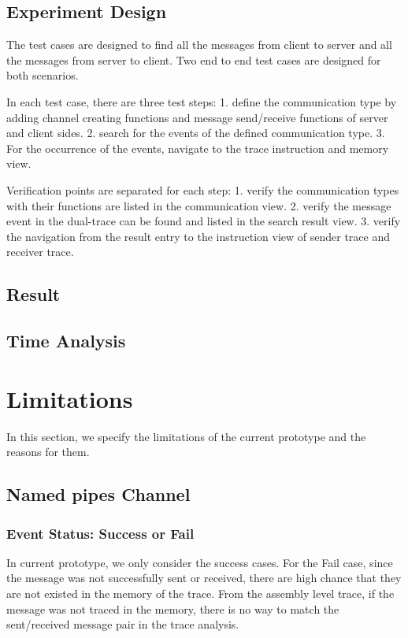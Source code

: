 \documentclass[paper=a4, fontsize=11pt]{scrartcl}
\numberwithin{equation}{section}		%
\numberwithin{figure}{section}			%
\numberwithin{table}{section}				%
\begin{document}
\subsection{Experiment Design}
The test cases are designed to find all the messages from client to server and all the messages from server to client. Two end to end test cases are designed for both scenarios. 

In each test case, there are three test steps: 1. define the communication type by adding channel creating functions and message send/receive functions of server and client sides. 2. search for the events of  the defined communication type. 3. For the occurrence of the events, navigate to the trace instruction and memory view.

Verification points are separated for each step: 1. verify the communication types with their functions are listed in the communication view. 2. verify the message event in the dual-trace can be found and listed in the search result view. 3. verify the navigation from the result entry to the instruction view of sender trace and receiver trace.
\subsection{Result}
\subsection{Time Analysis}
\section{Limitations}
In this section, we specify the limitations of the current prototype and the reasons for them. 
\subsection{Named pipes Channel}
\subsubsection{Event Status: Success or Fail}
In current prototype, we only consider the success cases. For the Fail case, since the message was not successfully sent or received, there are high chance that they are not existed in the memory of the trace. From the assembly level trace, if the message was not traced in the memory, there is no way to match the sent/received message pair in the trace analysis.   
\end{document}
